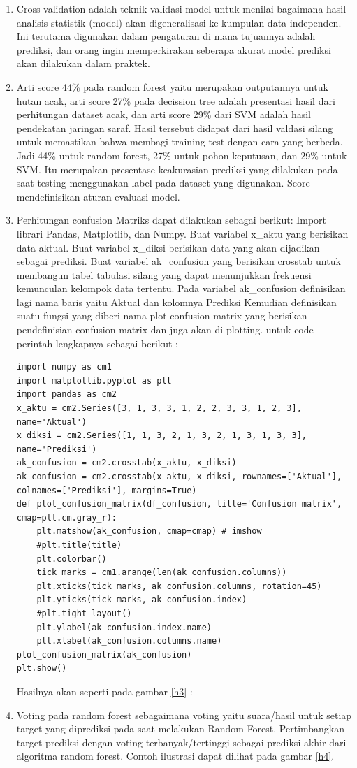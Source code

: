 \begin{enumerate}
\item Cross validation adalah teknik validasi model untuk menilai bagaimana hasil analisis statistik (model) akan digeneralisasi ke kumpulan data independen. Ini terutama digunakan dalam pengaturan di mana tujuannya adalah prediksi, dan orang ingin memperkirakan seberapa akurat model prediksi akan dilakukan dalam praktek.
\item Arti score 44\% pada random forest yaitu merupakan outputannya untuk hutan acak, arti score 27\% pada decission tree adalah presentasi hasil dari perhitungan dataset acak, dan arti score 29\% dari SVM adalah hasil pendekatan jaringan saraf.  Hasil tersebut didapat dari hasil valdasi silang untuk memastikan bahwa membagi training test dengan cara yang berbeda. Jadi 44\% untuk random forest, 27\% untuk pohon keputusan, dan 29\% untuk SVM. Itu merupakan presentase keakurasian prediksi yang dilakukan pada saat testing menggunakan label pada dataset yang digunakan. Score mendefinisikan aturan evaluasi model.
\item Perhitungan confusion Matriks dapat dilakukan sebagai berikut:
\subitem Import librari Pandas, Matplotlib, dan Numpy.
\subitem Buat variabel x\_aktu yang berisikan data aktual.
\subitem Buat variabel x\_diksi berisikan data yang akan dijadikan sebagai prediksi.
\subitem Buat variabel ak\_confusion yang berisikan crosstab untuk membangun tabel tabulasi silang yang dapat menunjukkan frekuensi kemunculan kelompok data tertentu.
\subitem Pada variabel ak\_confusion definisikan lagi nama baris yaitu Aktual dan kolomnya Prediksi
\subitem Kemudian definisikan suatu fungsi yang diberi nama plot confusion matrix yang berisikan pendefinisian confusion matrix dan juga akan di plotting. untuk code perintah lengkapnya sebagai berikut :
\subitem
\begin{verbatim}
import numpy as cm1
import matplotlib.pyplot as plt
import pandas as cm2
x_aktu = cm2.Series([3, 1, 3, 3, 1, 2, 2, 3, 3, 1, 2, 3], name='Aktual')
x_diksi = cm2.Series([1, 1, 3, 2, 1, 3, 2, 1, 3, 1, 3, 3], name='Prediksi')
ak_confusion = cm2.crosstab(x_aktu, x_diksi)
ak_confusion = cm2.crosstab(x_aktu, x_diksi, rownames=['Aktual'], colnames=['Prediksi'], margins=True)
def plot_confusion_matrix(df_confusion, title='Confusion matrix', cmap=plt.cm.gray_r):
    plt.matshow(ak_confusion, cmap=cmap) # imshow
    #plt.title(title)
    plt.colorbar()
    tick_marks = cm1.arange(len(ak_confusion.columns))
    plt.xticks(tick_marks, ak_confusion.columns, rotation=45)
    plt.yticks(tick_marks, ak_confusion.index)
    #plt.tight_layout()
    plt.ylabel(ak_confusion.index.name)
    plt.xlabel(ak_confusion.columns.name)
plot_confusion_matrix(ak_confusion)
plt.show()
\end{verbatim}
Hasilnya akan seperti pada gambar \ref{h3} :
\item Voting pada random forest sebagaimana voting yaitu suara/hasil untuk setiap target yang diprediksi pada saat melakukan Random Forest. Pertimbangkan target prediksi dengan voting terbanyak/tertinggi sebagai prediksi akhir dari algoritma random forest. Contoh ilustrasi dapat dilihat pada gambar \ref{h4}.
\end{enumerate}

